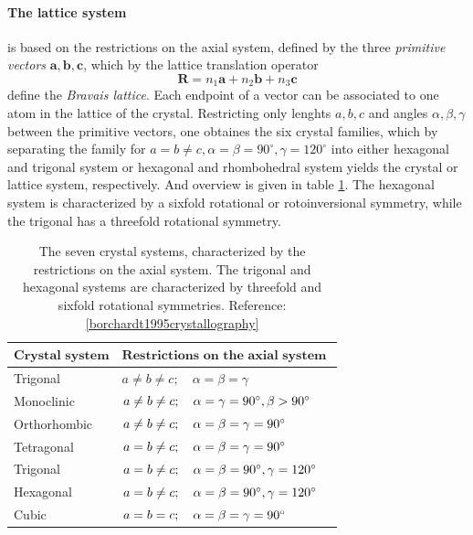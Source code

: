 \paragraph{The lattice system} 
is based on the restrictions on the axial 
system, defined by the three 
\emph{primitive vectors} $\mathbf{a, b, c}$, which 
by the lattice translation operator 
\begin{equation}
    \mathbf{R} = n_1 \mathbf{a} + n_2 \mathbf{b} + n_3 \mathbf{c}
\end{equation}
define the \emph{Bravais lattice}. Each endpoint of a vector 
can be associated to one atom in the lattice of the crystal. 
Restricting only lenghts $a, b, c$ and angles $\alpha, \beta, \gamma$ 
between the primitive vectors, 
one obtaines the six crystal families, which by separating the 
family for $a = b \neq c, \alpha = \beta = 90^\circ, \gamma = 120^\circ$ 
into either hexagonal and trigonal system 
or hexagonal and rhombohedral system yields the crystal or lattice 
system, respectively. And overview is given in table 
\ref{tab:crystal_systems}. The hexagonal system is characterized by 
a sixfold rotational or rotoinversional symmetry, while the 
trigonal has a threefold rotational symmetry. 

\renewcommand{\arraystretch}{1.5}
\begin{table}[htdp]
    \begin{tabular}{|p{}|p{}|}
        \hline
        \rowcolor{LightCyan}
        $\textbf{Crystal system}$ & 
        $\textbf{Restrictions on the axial system   }$ \\ 
        \hline
        Trigonal        & $a \neq b \neq c; \quad \alpha = \beta = \gamma$ \\ 
        Monoclinic      & $a \neq b \neq c; \quad \alpha = \gamma = 90^\circ, \beta > 90^\circ$ \\ 
        Orthorhombic    & $a \neq b \neq c; \quad \alpha = \beta = \gamma = 90^\circ$         \\
        Tetragonal      & $a    = b \neq c; \quad \alpha = \beta = \gamma = 90^\circ$         \\ 
        Trigonal        & $a    = b \neq c; \quad \alpha = \beta = 90^\circ, \gamma = 120^\circ$ \\ 
        Hexagonal       & $a    = b \neq c; \quad \alpha = \beta = 90^\circ, \gamma = 120^\circ$ \\ 
        Cubic           & $a    = b =    c; \quad \alpha = \beta = \gamma = 90^\circ$         \\ 
        \hline
    \end{tabular}
\caption{
    The seven crystal systems, characterized by the restrictions on the axial system. 
    The trigonal and hexagonal systems are characterized by threefold and sixfold rotational 
    symmetries. 
    Reference: \ref{borchardt1995crystallography}
    }
\label{tab:crystal_systems}
\end{table}

